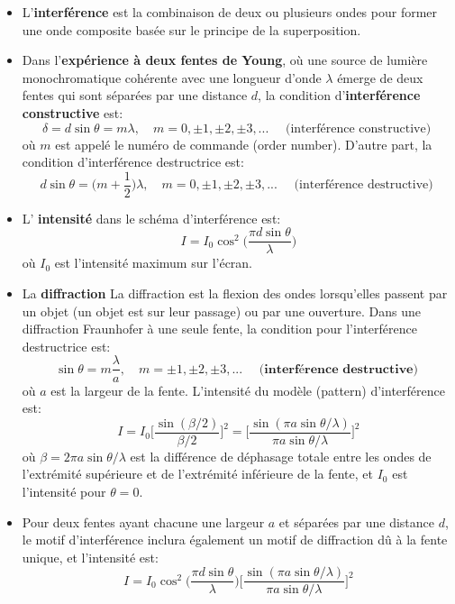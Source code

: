 \documentclass[a4paper]{article}
\begin{document}
\begin{itemize}
    \item L'\textbf{interférence} est la combinaison de deux ou plusieurs ondes pour former une onde composite basée sur le principe de
la superposition.
    \item Dans l'\textbf{expérience à deux fentes de Young}, où une source de lumière monochromatique cohérente avec une longueur d'onde 
$ \lambda $ émerge de deux fentes qui sont séparées par une distance $ d $, la condition d'\textbf{interférence constructive} est: 
\[ \delta = d \sin \theta = m \lambda, \quad m = 0, \pm 1, \pm 2, \pm 3, ... \quad \text{ (interférence constructive) } \]
où $ m $ est appelé le numéro de commande (order number). D'autre part, la condition d'interférence destructrice est: 
\[ d \sin \theta = \Big( m + \frac{1}{2} \Big) \lambda, \quad m = 0, \pm 1, \pm 2, \pm 3, ... \quad \text{ (interférence destructive) } \]
    \item L' \textbf{intensité} dans le schéma d'interférence est: 
\[ I = I_0 \cos^2 \Big( \frac{\pi d \sin \theta}{\lambda} \Big) \]
où $ I_0 $ est l'intensité maximum sur l'écran.
    \item La \textbf{diffraction} La diffraction est la flexion des ondes lorsqu'elles passent par un objet (un objet est sur leur 
passage) ou par une ouverture. Dans une diffraction Fraunhofer à une seule fente, la condition pour l'interférence destructrice est: 
\[ \sin \theta = m \frac{\lambda}{a}, \quad m = \pm 1, \pm 2, \pm 3, ... \quad \textbf{ (interférence destructive) } \]
où $ a $ est la largeur de la fente. L'intensité du modèle (pattern) d'interférence est: 
\[ I = I_0 \Big[ \frac{\sin (\beta / 2)}{\beta / 2} \Big]^2 = \Big[ \frac{\sin (\pi a \sin \theta / \lambda)}{\pi a \sin \theta / \lambda} \Big]^2 \]
où $ \beta = 2 \pi a \sin \theta / \lambda $ est la différence de déphasage totale entre les ondes de l'extrémité supérieure et de l'extrémité inférieure de la fente, et $ I_0 $ est l'intensité pour $ \theta = 0 $.
    \item Pour deux fentes ayant chacune une largeur $ a $ et séparées par une distance $ d $, le motif d'interférence inclura également 
un motif de diffraction dû à la fente unique, et l'intensité est: 
\[ I = I_0 \cos^2 \bigg( \frac{\pi d \sin \theta}{\lambda} \bigg) \bigg[ \frac{\sin (\pi a \sin \theta / \lambda)}{\pi a \sin \theta / \lambda} \bigg]^2 \]
\end{itemize}
\end{document}
